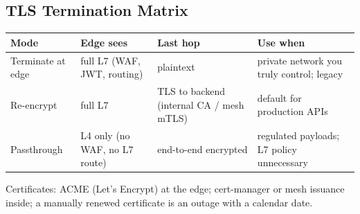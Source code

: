 \subsection*{TLS Termination Matrix}
\begin{table}[h]
  \centering
  \small
  \begin{tabularx}{\textwidth}{l X X X}
    \toprule
    \textbf{Mode} & \textbf{Edge sees} & \textbf{Last hop} & \textbf{Use when} \\
    \midrule
    Terminate at edge & full L7 (WAF, JWT, routing) & plaintext & private network you truly control; legacy \\
    Re-encrypt & full L7 & TLS to backend (internal CA / mesh mTLS) & default for production APIs \\
    Passthrough & L4 only (no WAF, no L7 route) & end-to-end encrypted & regulated payloads; L7 policy unnecessary \\
    \bottomrule
  \end{tabularx}
\end{table}

Certificates: ACME (Let's Encrypt) at the edge; cert-manager or mesh
issuance inside; a manually renewed certificate is an outage with a
calendar date.


